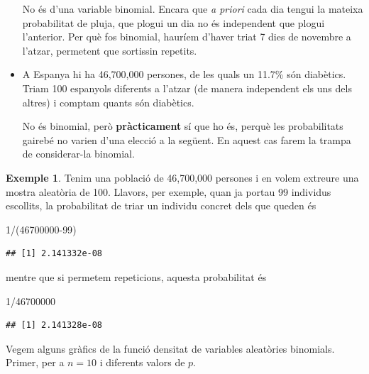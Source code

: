 \documentclass[
]{book}
\newenvironment{Shaded}{\begin{snugshade}}{\end{snugshade}}
\newcommand{\DecValTok}[1]{\textcolor[rgb]{0.00,0.00,0.81}{#1}}
\newcommand{\NormalTok}[1]{#1}
\newcommand{\SpecialCharTok}[1]{\textcolor[rgb]{0.00,0.00,0.00}{#1}}
\theoremstyle{definition}
\theoremstyle{definition}
\newtheorem{example}{Exemple}[chapter]
\theoremstyle{definition}
\theoremstyle{remark}
\begin{document}
\begin{itemize}
  No és d'una variable binomial. Encara que \emph{a priori} cada dia tengui la mateixa probabilitat de pluja, que plogui un dia no és independent que plogui l'anterior. Per què fos binomial, hauríem d'haver triat 7 dies de novembre a l'atzar, permetent que sortissin repetits.
\item
  A Espanya hi ha 46,700,000 persones, de les quals un 11.7\% són diabètics. Triam 100 espanyols diferents a l'atzar (de manera independent els uns dels altres) i comptam quants són diabètics.

  No és binomial, però \textbf{pràcticament} sí que ho és, perquè les probabilitats gairebé no varien d'una elecció a la següent. En aquest cas farem la trampa de considerar-la binomial.
\end{itemize}

\begin{example}
\protect\hypertarget{exm:999}{}{\label{exm:999} }Tenim una població de 46,700,000 persones i en volem extreure una mostra aleatòria de 100. Llavors, per exemple, quan ja portau 99 individus escollits, la probabilitat de triar un individu concret dels que queden és
\end{example}

\begin{Shaded}
\begin{Highlighting}[]
\DecValTok{1}\SpecialCharTok{/}\NormalTok{(}\DecValTok{46700000{-}99}\NormalTok{)}
\end{Highlighting}
\end{Shaded}

\begin{verbatim}
## [1] 2.141332e-08
\end{verbatim}

mentre que si permetem repeticions, aquesta probabilitat és

\begin{Shaded}
\begin{Highlighting}[]
\DecValTok{1}\SpecialCharTok{/}\DecValTok{46700000}
\end{Highlighting}
\end{Shaded}

\begin{verbatim}
## [1] 2.141328e-08
\end{verbatim}

Vegem alguns gràfics de la funció densitat de variables aleatòries binomials. Primer, per a \(n=10\) i diferents valors de \(p\).
\end{document}
